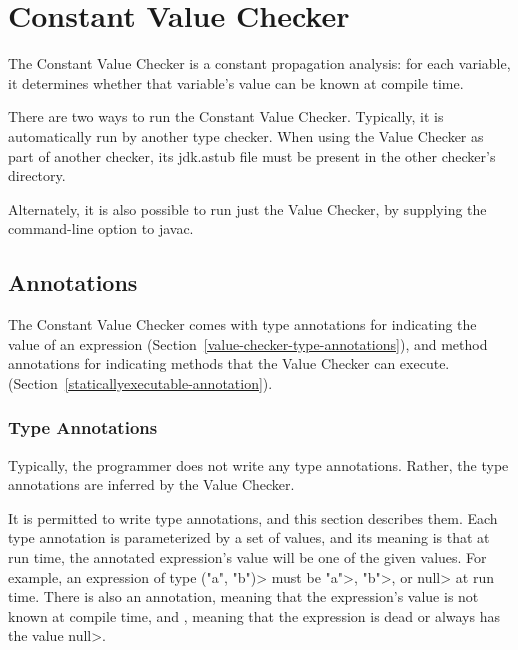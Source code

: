\htmlhr
\chapter{Constant Value Checker\label{value-checker}}

The Constant Value Checker is a constant propagation analysis: for
each variable, it determines whether that variable's value can be
known at compile time.

There are two ways to run the Constant Value Checker.
Typically, it is automatically run by another type checker.
When using the Value Checker as part of another checker, its
jdk.astub file must be present in the other checker's directory.

Alternately, it is also possible to run just the Value Checker, by
supplying the
command-line option to javac.


\section{Annotations\label{value-checker-annotations}}

The Constant Value Checker comes with type annotations for indicating the
value of an expression (Section~\ref{value-checker-type-annotations}), and
method annotations for indicating methods that the Value Checker can execute.
(Section~\ref{staticallyexecutable-annotation}).


\subsection{Type Annotations\label{value-checker-type-annotations}}

Typically, the programmer does not write any type annotations.  Rather, the
type annotations are inferred by the Value Checker.

It is permitted to write type annotations, and this section describes them.
Each type annotation is parameterized by a set of values, and its meaning
is that at run time, the annotated expression's value will be one of the
given values.  For example, an expression of type 
\<("a", "b")> must be
\<"a">, \<"b">, or \<null> at run time.
There is also an  annotation,
meaning that the expression's value is not known at compile time, and 
, meaning that the expression
is dead or always has the value \<null>.

